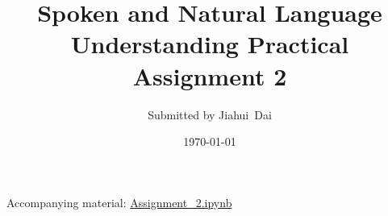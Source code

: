 \documentclass[a4paper]{article}
\begin{document}
\title{
    Spoken and Natural Language Understanding Practical\\
    Assignment 2
}
\author{Submitted by Jiahui~Dai}
\date{\today}
\maketitle

Accompanying material: \href{file:Assignment_2.ipynb}{Assignment\_2.ipynb}



% 


\newpage
\printbibliography
\end{document}
